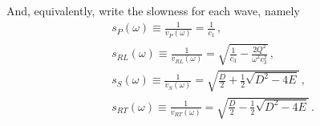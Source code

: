 \documentclass[12pt]{article}
\begin{document}
And, equivalently, write the slowness for each wave, namely
\begin{align}
&s_P(\omega) \equiv \frac{1}{v_P(\omega)} = \frac{1}{c_1}\, ,\\
&s_{RL}(\omega) \equiv \frac{1}{v_{RL}(\omega)} = \sqrt{\frac{1}{c_3} - \frac{2Q^2}{\omega^2 c_3^2}}\, ,\\
&s_S(\omega)\equiv \frac{1}{v_S(\omega)} = \sqrt{\frac{D}{2} + \frac{1}{2} \sqrt{D^2 - 4E}}\, ,\\
&s_{RT}(\omega) \equiv \frac{1}{v_{RT}(\omega)} = \sqrt{\frac{D}{2} - \frac{1}{2} \sqrt{D^2 - 4E}}\, .
\end{align}



\end{document}
